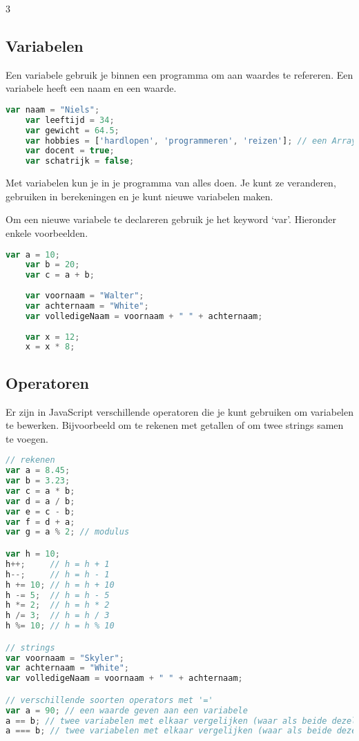 \documentclass[8pt,pagesize,footinclude=false,headinclude=false]{scrartcl}
\begin{document}
\begin{multicols*}{3}
\subsection*{Variabelen}
Een variabele gebruik je binnen een programma om aan waardes te refereren. Een variabele heeft een naam en een waarde.
\begin{lstlisting}[language=JavaScript]
	var naam = "Niels";
	var leeftijd = 34;
	var gewicht = 64.5;
	var hobbies = ['hardlopen', 'programmeren', 'reizen']; // een Array met waarden
	var docent = true;
	var schatrijk = false;
\end{lstlisting}

\noindent Met variabelen kun je in je programma van alles doen. Je kunt ze veranderen, gebruiken in berekeningen en je kunt nieuwe variabelen maken.

Om een nieuwe variabele te declareren gebruik je het keyword `var'. Hieronder enkele voorbeelden.
\begin{lstlisting}[language=JavaScript]
	var a = 10;
	var b = 20;
	var c = a + b;
	
	var voornaam = "Walter";
	var achternaam = "White";
	var volledigeNaam = voornaam + " " + achternaam;
	
	var x = 12;
	x = x * 8;
\end{lstlisting}

\subsection*{Operatoren}
Er zijn in JavaScript verschillende operatoren die je kunt gebruiken om variabelen te bewerken. Bijvoorbeeld om te rekenen met getallen of om twee strings samen te voegen.
\begin{lstlisting}[language=JavaScript]
// rekenen
var a = 8.45;
var b = 3.23;
var c = a * b;
var d = a / b;
var e = c - b;
var f = d + a;
var g = a % 2; // modulus

var h = 10;
h++;     // h = h + 1
h--;     // h = h - 1
h += 10; // h = h + 10
h -= 5;  // h = h - 5
h *= 2;  // h = h * 2
h /= 3;  // h = h / 3
h %= 10; // h = h % 10

// strings
var voornaam = "Skyler";
var achternaam = "White";
var volledigeNaam = voornaam + " " + achternaam;

// verschillende soorten operators met '='
var a = 90; // een waarde geven aan een variabele
a == b; // twee variabelen met elkaar vergelijken (waar als beide dezelfde waarde hebben)
a === b; // twee variabelen met elkaar vergelijken (waar als beide dezelfde waarde hebben en van hetzelfde type zijn, allebei nummers of strings et cetera)
\end{lstlisting}


\end{multicols*}
\end{document}
